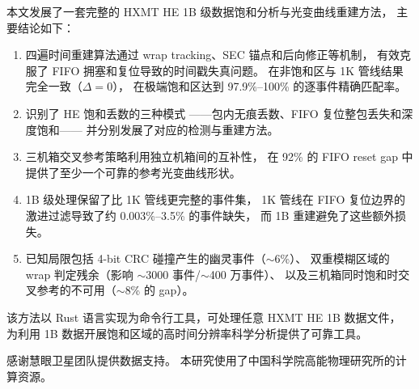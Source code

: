 \documentclass[aps,prd,twocolumn,nofootinbib,superscriptaddress]{revtex4-2}
\begin{document}
本文发展了一套完整的 HXMT HE 1B 级数据饱和分析与光变曲线重建方法，
主要结论如下：

\begin{enumerate}
  \item 四遍时间重建算法通过 wrap tracking、SEC 锚点和后向修正等机制，
    有效克服了 FIFO 拥塞和复位导致的时间戳失真问题。
    在非饱和区与 1K 管线结果完全一致（$\Delta = 0$），
    在极端饱和区达到 97.9\%--100\% 的逐事件精确匹配率。

  \item 识别了 HE 饱和丢数的三种模式
    ——包内无痕丢数、FIFO 复位整包丢失和深度饱和——
    并分别发展了对应的检测与重建方法。

  \item 三机箱交叉参考策略利用独立机箱间的互补性，
    在 92\% 的 FIFO reset gap 中提供了至少一个可靠的参考光变曲线形状。

  \item 1B 级处理保留了比 1K 管线更完整的事件集，
    1K 管线在 FIFO 复位边界的激进过滤导致了约 0.003\%--3.5\% 的事件缺失，
    而 1B 重建避免了这些额外损失。

  \item 已知局限包括 4-bit CRC 碰撞产生的幽灵事件（$\sim$6\%）、
    双重模糊区域的 wrap 判定残余（影响 $\sim$3000 事件/$\sim$400 万事件）、
    以及三机箱同时饱和时交叉参考的不可用（$\sim$8\% 的 gap）。
\end{enumerate}

该方法以 Rust 语言实现为命令行工具，可处理任意 HXMT HE 1B 数据文件，
为利用 1B 数据开展饱和区域的高时间分辨率科学分析提供了可靠工具。

\begin{acknowledgments}
感谢慧眼卫星团队提供数据支持。
本研究使用了中国科学院高能物理研究所的计算资源。
\end{acknowledgments}
\end{document}
